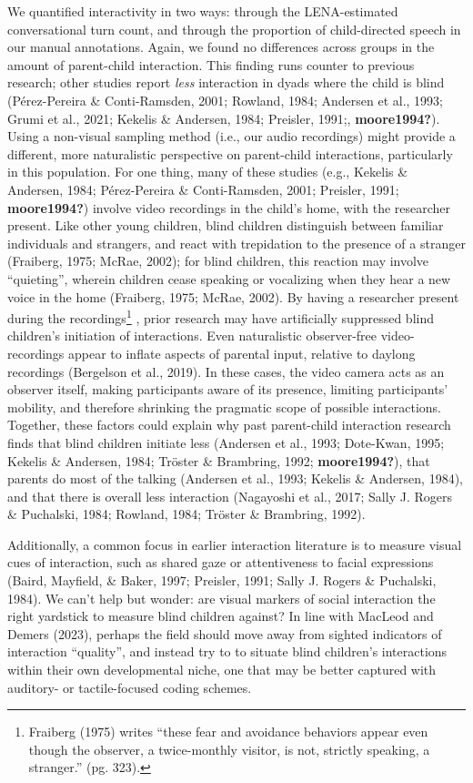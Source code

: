 \documentclass[
  man,floatsintext]{apa6}
\begin{document}
We quantified interactivity in two ways: through the LENA-estimated conversational turn count, and through the proportion of child-directed speech in our manual annotations. Again, we found no differences across groups in the amount of parent-child interaction. This finding runs counter to previous research; other studies report \emph{less} interaction in dyads where the child is blind (Pérez-Pereira \& Conti-Ramsden, 2001; Rowland, 1984; Andersen et al., 1993; Grumi et al., 2021; Kekelis \& Andersen, 1984; Preisler, 1991;, \textbf{moore1994?}). Using a non-visual sampling method (i.e., our audio recordings) might provide a different, more naturalistic perspective on parent-child interactions, particularly in this population. For one thing, many of these studies (e.g., Kekelis \& Andersen, 1984; Pérez-Pereira \& Conti-Ramsden, 2001; Preisler, 1991; \textbf{moore1994?}) involve video recordings in the child's home, with the researcher present. Like other young children, blind children distinguish between familiar individuals and strangers, and react with trepidation to the presence of a stranger (Fraiberg, 1975; McRae, 2002); for blind children, this reaction may involve ``quieting'', wherein children cease speaking or vocalizing when they hear a new voice in the home (Fraiberg, 1975; McRae, 2002). By having a researcher present during the recordings\footnote{Fraiberg (1975) writes ``these fear and avoidance behaviors appear even though the observer, a twice-monthly visitor, is not, strictly speaking, a stranger.'' (pg. 323).} , prior research may have artificially suppressed blind children's initiation of interactions. Even naturalistic observer-free video-recordings appear to inflate aspects of parental input, relative to daylong recordings (Bergelson et al., 2019). In these cases, the video camera acts as an observer itself, making participants aware of its presence, limiting participants' mobility, and therefore shrinking the pragmatic scope of possible interactions. Together, these factors could explain why past parent-child interaction research finds that blind children initiate less (Andersen et al., 1993; Dote-Kwan, 1995; Kekelis \& Andersen, 1984; Tröster \& Brambring, 1992; \textbf{moore1994?}), that parents do most of the talking (Andersen et al., 1993; Kekelis \& Andersen, 1984), and that there is overall less interaction (Nagayoshi et al., 2017; Sally J. Rogers \& Puchalski, 1984; Rowland, 1984; Tröster \& Brambring, 1992).

Additionally, a common focus in earlier interaction literature is to measure visual cues of interaction, such as shared gaze or attentiveness to facial expressions (Baird, Mayfield, \& Baker, 1997; Preisler, 1991; Sally J. Rogers \& Puchalski, 1984). We can't help but wonder: are visual markers of social interaction the right yardstick to measure blind children against? In line with MacLeod and Demers (2023), perhaps the field should move away from sighted indicators of interaction ``quality'', and instead try to to situate blind children's interactions within their own developmental niche, one that may be better captured with auditory- or tactile-focused coding schemes.
\end{document}
